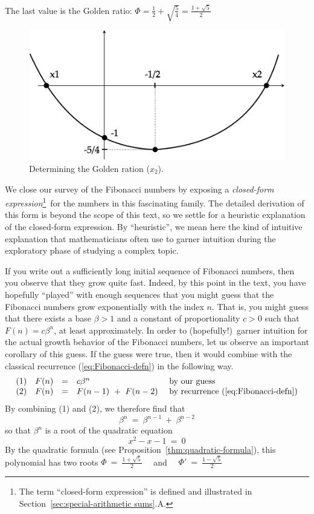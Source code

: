 The last value is the Golden ratio: $\Phi = \frac{1}{2} + \sqrt{\frac{5}{4}} = \frac{1+\sqrt{5}}{2}$

\begin{figure}[htb]
\begin{center}
       \includegraphics[scale=0.3]{FiguresArithmetic/SecondDegreeFibo}
\caption{Determining the Golden ration ($x_2$).}
\label{fig:SecondDegreeFibo}
\end{center}
\end{figure}

We close our survey of the Fibonacci numbers by exposing a {\it
  closed-form expression}\footnote{The term ``closed-form expression''
  is defined and illustrated in Section~\ref{sec:special-arithmetic
    sums}.A.}~for the numbers in this fascinating family.  The
detailed derivation of this form is beyond the scope of this text, so
we settle for a heuristic explanation of the closed-form expression.
By ``heuristic'', we mean here the kind of intuitive explanation that
mathematicians often use to garner intuition during the exploratory
phase of studying a complex topic. 

If you write out a sufficiently long initial sequence of Fibonacci
numbers, then you observe that they grow quite fast.  Indeed, by this
point in the text, you have hopefully ``played'' with enough sequences
that you might guess that the Fibonacci numbers grow exponentially
with the index $n$.  That is, you might guess that there exists a base
$\beta > 1$ and a constant of proportionality $c > 0$ such that $F(n)
= c \beta^n$, at least approximately.  In order to (hopefully!)~garner
intuition for the actual growth behavior of the Fibonacci numbers, let
us observe an important corollary of this guess.  If the guess were
true, then it would combine with the classical recurrence
(\ref{eq:Fibonacci-defn}) in the following way.
\[ \begin{array}{cccll}
(1) & F(n) & = & c \beta^n
      & \mbox{ by our guess} \\
(2) & F(n) & = & F(n-1) \ + \ F(n-2)
      & \mbox{ by recurrence (\ref{eq:Fibonacci-defn})}
\end{array}
\]
By combining (1) and (2), we therefore find that
\[ \beta^n \ = \ \beta^{n-1} \ + \ \beta^{n-2} \]
so that $\beta^n$ is a root of the quadratic equation
\[
x^2 - x - 1 \ = \ 0
\]
By the quadratic formula (see
Proposition~\ref{thm:quadratic-formula}), this polynomial has two roots 
$\Phi \ = \ {\displaystyle \frac{1+\sqrt{5}}{2}}$ \ \ and \ \
$\Phi' \ = \ {\displaystyle \frac{1-\sqrt{5}}{2}}$

